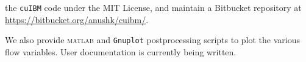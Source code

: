 \documentclass{tufte-handout}
\newcommand{\cuibm}{\Verb|cuIBM|\xspace}
\begin{document}
 the {\cuibm} code under the MIT License, and maintain a Bitbucket repository at \href{https://bitbucket.org/anushk/cuibm/}{https://bitbucket.org/anushk/cuibm/}.

\noindent We also provide \textsc{matlab} and \texttt{Gnuplot} postprocessing scripts to plot the various flow variables. User documentation is currently being written.



\end{document}
